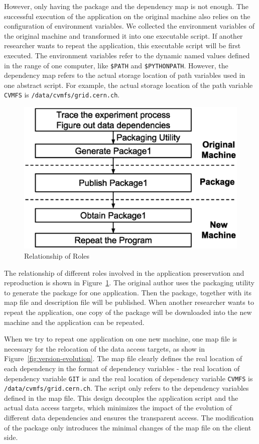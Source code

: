 \documentclass[procedia]{easychair}
\begin{document}
However, only having the package and the dependency map is not enough. The successful execution of the application on the original machine also relies on the configuration of environment variables.
We collected the environment variables of the original machine and transformed it into one executable script. If another researcher wants to repeat the application, this executable script will be first executed. 
The environment variables refer to the dynamic named values defined in the range of one computer, like \verb!$PATH! and \verb!$PYTHONPATH!.
However, the dependency map refers to the actual storage location of path variables used in one abstract script. For example, the actual storage location of the path variable \verb!CVMFS! 
is {\tt /data/cvmfs/grid.cern.ch}.

\begin{figure}
\centering
\includegraphics[width=.5\textwidth]{solution3.eps}
\caption{Relationship of Roles}
\label{fig:solution3}
\end{figure}

The relationship of different roles involved in the application preservation and
reproduction is shown in Figure~\ref{fig:solution3}.  The original author uses the packaging utility to generate the package for one application.
Then the package, together with
its map file and description file will be published. When
another researcher wants to repeat the application, one copy of the package will be downloaded into the new machine and the application can be repeated.

When we try to repeat one application on one new machine, one map file is necessary for the relocation of the data access targets, as
show in Figure~\ref{fig:version-evolution}. 
The map file clearly defines the real location of each dependency in the format of dependency variables - the real location of dependency variable {\tt GIT} is  and the real location of dependency variable {\tt CVMFS}
is {\tt /data/cvmfs/grid.cern.ch}.
The script only refers to the dependency variables defined in the map file.
This design decouples the application script and the actual data access targets, which minimizes the impact of the evolution of different data dependencies
and ensures the transparent access.
The modification of the package only introduces the minimal changes of the map file on the client side.
\end{document}
